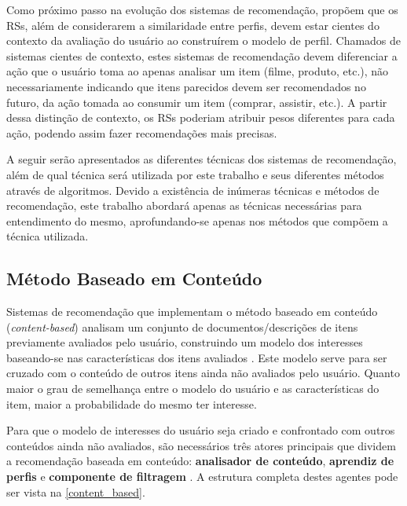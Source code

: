 Como próximo passo na evolução dos sistemas de recomendação,  propõem que os RSs, além de considerarem a similaridade entre perfis, devem estar cientes do contexto da avaliação do usuário ao construírem o modelo de perfil. Chamados de sistemas cientes de contexto, estes sistemas de recomendação devem diferenciar a ação que o usuário toma ao apenas analisar um item (filme, produto, etc.), não necessariamente indicando que itens parecidos devem ser recomendados no futuro, da ação tomada ao consumir um item (comprar, assistir, etc.). A partir dessa distinção de contexto, os RSs poderiam atribuir pesos diferentes para cada ação, podendo assim fazer recomendações mais precisas.

A seguir serão apresentados as diferentes técnicas dos sistemas de recomendação, além de qual técnica será utilizada por este trabalho e seus diferentes métodos através de algoritmos. Devido a existência de inúmeras técnicas e métodos de recomendação, este trabalho abordará apenas as técnicas necessárias para entendimento do mesmo, aprofundando-se apenas nos métodos que compõem a técnica utilizada.

\subsection{Método Baseado em Conteúdo} \label{recs:content_based}

Sistemas de recomendação que implementam o método baseado em conteúdo (\textit{content-based}) analisam um conjunto de documentos/descrições de itens previamente avaliados pelo usuário, construindo um modelo dos interesses baseando-se nas características dos itens avaliados \cite{mladenic1999text, adomavicius2005toward, lops2011content}. Este modelo serve para ser cruzado com o conteúdo de outros itens ainda não avaliados pelo usuário. Quanto maior o grau de semelhança entre o modelo do usuário e as características do item, maior a probabilidade do mesmo ter interesse.

Para que o modelo de interesses do usuário seja criado e confrontado com outros conteúdos ainda não avaliados, são necessários três atores principais que dividem a recomendação baseada em conteúdo: \textbf{analisador de conteúdo}, \textbf{aprendiz de perfis} e \textbf{componente de filtragem} \cite{lops2011content}. A estrutura completa destes agentes pode ser vista na \autoref{content_based}.

